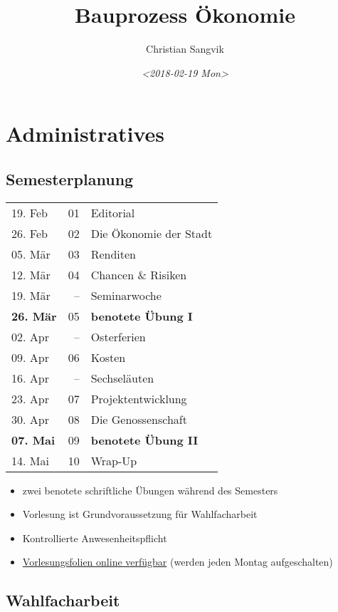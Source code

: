 \documentclass[11pt]{article}
\author{Christian Sangvik}
\date{\textit{<2018-02-19 Mon>}}
\title{Bauprozess Ökonomie}
\begin{document}
\maketitle
\tableofcontents


\section{Administratives}
\label{sec-1}

\subsection{Semesterplanung}
\label{sec-1-1}

\begin{center}
\begin{tabular}{lrl}
19. Feb & 01 & Editorial\\
26. Feb & 02 & Die Ökonomie der Stadt\\
05. Mär & 03 & Renditen\\
12. Mär & 04 & Chancen \& Risiken\\
19. Mär & -- & Seminarwoche\\
\textbf{26. Mär} & 05 & \textbf{benotete Übung I}\\
02. Apr & -- & Osterferien\\
09. Apr & 06 & Kosten\\
16. Apr & -- & Sechseläuten\\
23. Apr & 07 & Projektentwicklung\\
30. Apr & 08 & Die Genossenschaft\\
\textbf{07. Mai} & 09 & \textbf{benotete Übung II}\\
14. Mai & 10 & Wrap-Up\\
\end{tabular}
\end{center}

\begin{itemize}
\item zwei benotete schriftliche Übungen während des Semesters
\item Vorlesung ist Grundvoraussetzung für Wahlfacharbeit
\item Kontrollierte Anwesenheitspflicht
\item \href{http://www.bauprozess.arch.ethz.ch/education/MSc/BauprozessOekonomie.html}{Vorlesungsfolien online verfügbar} (werden jeden Montag aufgeschalten)
\end{itemize}

\subsection{Wahlfacharbeit}
\label{sec-1-2}
\end{document}

